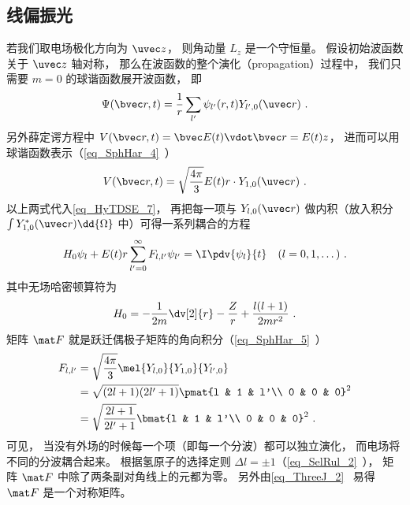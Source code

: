 \subsection{线偏振光}
若我们取电场极化方向为 $\uvec z$， 则角动量 $L_z$ 是一个守恒量。 假设初始波函数关于 $\uvec z$ 轴对称， 那么在波函数的整个演化（propagation）过程中， 我们只需要 $m=0$ 的球谐函数展开波函数， 即
\begin{equation}
\Psi(\bvec r, t) = \frac{1}{r}\sum_{l'} \psi_{l'}(r, t) Y_{l', 0}(\uvec r)~.
\end{equation}
另外薛定谔方程中 $V(\bvec r, t) = \bvec E(t) \vdot \bvec r = E(t) z$， 进而可以用球谐函数表示（\autoref{eq_SphHar_4}~）
\begin{equation}
V(\bvec r, t) = \sqrt{\frac{4\pi}{3}} E(t) r \cdot Y_{1,0}(\uvec r)~.
\end{equation}
以上两式代入\autoref{eq_HyTDSE_7}， 再把每一项与 $Y_{l,0}(\uvec r)$ 做内积（放入积分 $\int Y_{1,0}^*(\uvec r) \dd{\Omega}$ 中）可得一系列耦合的方程
\begin{equation}\label{eq_HyTDSE_4}
H_0 \psi_{l} + E(t)r\sum_{l' = 0}^{\infty} F_{l, l'} \psi_{l'} = \I \pdv{\psi_{l}}{t} \quad (l=0,1,\dots)~.
\end{equation}
其中无场哈密顿算符为
\begin{equation}
H_0 = -\frac{1}{2m} \dv[2]{r} -\frac{Z}{r} + \frac{l(l+1)}{2mr^2}~.
\end{equation}
矩阵 $\mat F$ 就是跃迁偶极子矩阵的角向积分（\autoref{eq_SphHar_5}~）
\begin{equation}
\begin{aligned}
F_{l,l'} &= \sqrt{\frac{4\pi}{3}} \mel{Y_{l,0}}{Y_{1,0}}{Y_{l',0}}\\
&= \sqrt{(2l+1)(2l'+1)} \pmat{l & 1 & l'\\ 0 & 0 & 0}^2\\
&= \sqrt{\frac{2l+1}{2l'+1}} \bmat{l & 1 & l'\\ 0 & 0 & 0}^2~.
\end{aligned}
\end{equation}
可见， 当没有外场的时候每一个项（即每一个分波）都可以独立演化， 而电场将不同的分波耦合起来。 根据氢原子的选择定则 $\Delta l = \pm 1$（\autoref{eq_SelRul_2}~）， 矩阵 $\mat F$ 中除了两条副对角线上的元都为零。 另外由\autoref{eq_ThreeJ_2}~ 易得 $\mat F$ 是一个对称矩阵。

